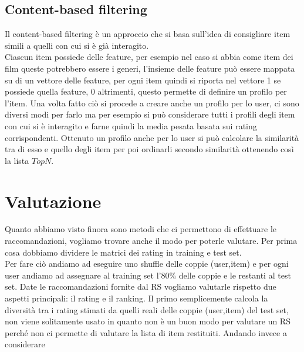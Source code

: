 \subsection{Content-based filtering}
Il content-based filtering è un approccio che si basa sull'idea di consigliare item simili a quelli con cui si è già interagito.\\
Ciascun item possiede delle feature, per esempio nel caso si abbia come item dei film queste potrebbero essere i generi, l'insieme delle feature può essere mappata su di un vettore delle feature, per ogni item quindi si riporta nel vettore 1 se possiede quella feature, 0 altrimenti, questo permette di definire un profilo per l'item.
Una volta fatto ciò si procede a creare anche un profilo per lo user, ci sono diversi modi per farlo ma per esempio si può considerare tutti i profili degli item con cui si è interagito e farne quindi la media pesata basata sui rating corrispondenti.
Ottenuto un profilo anche per lo user si può calcolare la similarità tra di esso e quello degli item per poi ordinarli secondo similarità ottenendo così la lista $TopN$.

\section{Valutazione}
Quanto abbiamo visto finora sono metodi che ci permettono di effettuare le raccomandazioni, vogliamo trovare anche il modo per poterle valutare. Per prima cosa dobbiamo dividere le matrici dei rating in training e test set.\\
Per fare ciò andiamo ad eseguire uno shuffle delle coppie (user,item) e per ogni user andiamo ad assegnare al training set l'80\% delle coppie e le restanti al test set.
Date le raccomandazioni fornite dal RS vogliamo valutarle rispetto due aspetti principali: il rating e il ranking.
Il primo semplicemente calcola la diversità tra i rating stimati da quelli reali delle coppie (user,item) del test set, non viene solitamente usato in quanto non è un buon modo per valutare un RS perché non ci permette di valutare la lista di item restituiti.
Andando invece a considerare 